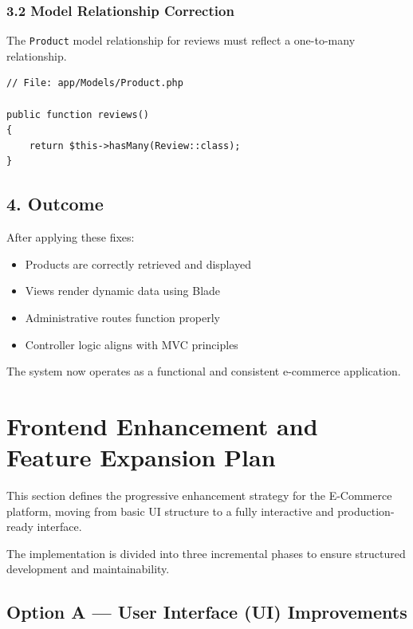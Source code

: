 \documentclass[12pt,a4paper]{article}
\begin{document}
\subsubsection{3.2 Model Relationship Correction}

The \texttt{Product} model relationship for reviews must reflect a one-to-many relationship.

\begin{verbatim}
// File: app/Models/Product.php

public function reviews()
{
    return $this->hasMany(Review::class);
}
\end{verbatim}

\subsection{4. Outcome}

After applying these fixes:

\begin{itemize}[noitemsep]
    \item Products are correctly retrieved and displayed
    \item Views render dynamic data using Blade
    \item Administrative routes function properly
    \item Controller logic aligns with MVC principles
\end{itemize}

The system now operates as a functional and consistent e-commerce application.

\section{Frontend Enhancement and Feature Expansion Plan}

This section defines the progressive enhancement strategy for the E-Commerce platform, moving from basic UI structure to a fully interactive and production-ready interface.

The implementation is divided into three incremental phases to ensure structured development and maintainability.

\subsection{Option A — User Interface (UI) Improvements}
\end{document}
